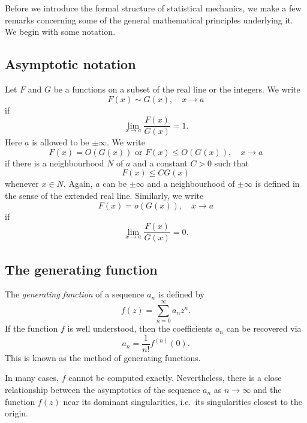 Before we introduce the formal structure of statistical mechanics, we make a
few remarks concerning some of the general mathematical principles underlying
it. We begin with some notation.

\subsection{Asymptotic notation}

Let $F$ and $G$ be a functions on a subset of the real line or the integers.
We write
\begin{equation}
F(x) \sim G(x),
	\quad
x \to a
\end{equation}
if
\begin{equation}
\lim_{x\to a} \frac{F(x)}{G(x)} = 1.
\end{equation}
Here $a$ is allowed to be $\pm\infty$. We write
\begin{equation}
F(x) = O(G(x))
	\text{ or }
F(x) \le O(G(x)),
	\quad
x \to a
\end{equation}
if there is a neighbourhood $N$ of $a$ and a constant $C > 0$ such that
\begin{equation}
F(x) \le C G(x)
\end{equation}
whenever $x \in N$. Again, $a$ can be $\pm\infty$ and a neighbourhood
of $\pm\infty$ is defined in the sense of the extended real line.
Similarly, we write
\begin{equation}
F(x) = o(G(x)),
	\quad
x \to a
\end{equation}
if
\begin{equation}
\lim_{x\to a} \frac{F(x)}{G(x)} = 0.
\end{equation}

\subsection{The generating function}

The \emph{generating function} of a sequence $a_n$ is defined by
\begin{equation}
f(z) = \sum_{n=0}^\infty a_n z^n.
\end{equation}
If the function $f$ is well understood, then the coefficients $a_n$ can be
recovered via
\begin{equation}
a_n = \frac{1}{n!} f^{(n)}(0).
\end{equation}
This is known as the method of generating functions.

In many cases, $f$ cannot be computed exactly. Nevertheless, there is a close
relationship between the asymptotics of the sequence $a_n$
as $n\to\infty$ and the function $f(z)$ near its dominant singularities, i.e.\
its singularities closest to the origin.


